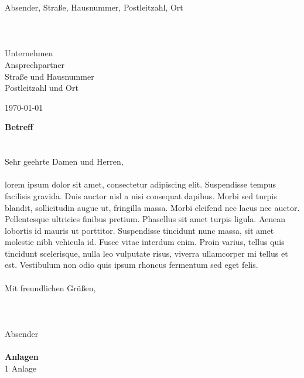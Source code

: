 \documentclass[a4paper,11pt]{letter}
\begin{document}
\noindent
\parbox[t][45mm]{80mm}{
  {\footnotesize Absender, Straße, Hausnummer, Postleitzahl, Ort}\\
  \\
  \\
  \\
  Unternehmen\\
  Ansprechpartner\\
  Straße und Hausnummer\\
  Postleitzahl und Ort\\
}

\hspace{142,5mm}
\parbox[t]{50mm}{
  \vspace{12,5mm}
  \germandate\today
}
\parbox[t]{165mm}{
\vspace{5mm}
\textbf{Betreff}\\
\\
\\
Sehr geehrte Damen und Herren,\\
\\
lorem ipsum dolor sit amet, consectetur adipiscing elit. Suspendisse tempus facilisis gravida. Duis auctor nisl a nisi consequat dapibus. Morbi sed 
turpis blandit, sollicitudin augue ut, fringilla massa. Morbi eleifend nec lacus nec auctor. Pellentesque ultricies finibus pretium. Phasellus sit 
amet turpis ligula. Aenean lobortis id mauris ut porttitor. Suspendisse tincidunt nunc massa, sit amet molestie nibh vehicula id. Fusce vitae interdum 
enim. Proin varius, tellus quis tincidunt scelerisque, nulla leo vulputate risus, viverra ullamcorper mi tellus et est. Vestibulum non odio quis ipsum 
rhoncus fermentum sed eget felis. \\
\\
Mit freundlichen Grüßen,\\
\\
\\
\\
Absender\\
\\
\textbf{Anlagen}\\
1 Anlage
}
\end{document}
